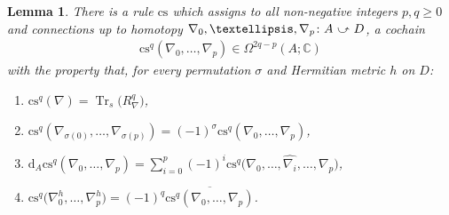 \documentclass[11pt]{article}
\numberwithin{equation}{section}
\newcommand{\homo}{ \ \raisebox{\depth}{\scalebox{1}[-1]{$\curvearrowright$}} \ }
\newcommand{\C}{\mathbb{C}}
\newcommand{\dd}{\mathrm{d}}
\newcommand{\8}{\infty}
\newtheorem*{lemma*}{Lemma}
\begin{document}
\begin{lemma*} There is a rule $\mathrm{cs}$ which assigns to all non-negative integers $p,q\geqslant 0$ and connections up to homotopy $\nabla_0,\dots ,\nabla_p\colon A \homo D$, a cochain
\begin{gather*}
 \mathrm{cs}^q(\nabla_0,\dots ,\nabla_p) \in \Omega^{2q-p}(A;\C)
\end{gather*}with the property that, for every permutation $\sigma$ and Hermitian metric $h$ on $D$:{\samepage
\begin{enumerate}\itemsep=0pt
 \item[$\mathrm{CS} 1)$] $\mathrm{cs}^q(\nabla)=\operatorname{Tr}_s\big(R_{\nabla}^q\big)$,
 \item[$\mathrm{CS} 2)$] $\mathrm{cs}^q(\nabla_{\sigma(0)},\dots ,\nabla_{\sigma (p)})=(-1)^{\sigma}\mathrm{cs}^q(\nabla_0,\dots ,\nabla_p)$,
 \item[$\mathrm{CS} 3)$] $\dd_A\mathrm{cs}^q(\nabla_0,\dots ,\nabla_p) = \sum\limits_{i=0}^p(-1)^i\mathrm{cs}^q\big(\nabla_0,\dots ,\widehat{\nabla_i},\dots ,\nabla_p\big)$,
 \item[$\mathrm{CS} 4)$] $\mathrm{cs}^q\big(\nabla_0^h,\dots ,\nabla_p^h\big) =(-1)^q\overline{\mathrm{cs}^q(\nabla_0,\dots ,\nabla_p)}$.
\end{enumerate}}
\end{lemma*}
\end{document}

